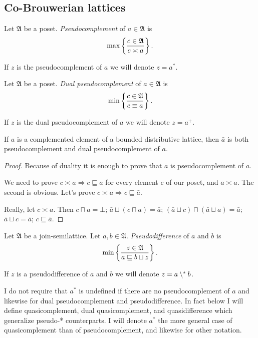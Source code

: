 \subsection{Co-Brouwerian lattices}
\begin{defn}
Let $\mathfrak{A}$ be a poset. \emph{Pseudocomplement}
of $a\in\mathfrak{A}$ is
\[
\max\left\{ \frac{c\in\mathfrak{A}}{c\asymp a}\right\}.
\]


If $z$ is the pseudocomplement of $a$ we will denote $z=a^{\ast}$.
\end{defn}

\begin{defn}
Let $\mathfrak{A}$ be a poset. \emph{Dual
pseudocomplement} of $a\in\mathfrak{A}$ is
\[
\min\left\{ \frac{c\in\mathfrak{A}}{c\equiv a}\right\}.
\]


If $z$ is the dual pseudocomplement of $a$ we will denote $z=a^{+}$.\end{defn}
\begin{prop}
If $a$ is a complemented element of a bounded distributive lattice,
then $\bar{a}$ is both pseudocomplement and dual pseudocomplement
of $a$.\end{prop}
\begin{proof}
Because of duality it is enough to prove that $\bar{a}$ is pseudocomplement
of $a$.

We need to prove $c\asymp a\Rightarrow c\sqsubseteq\bar{a}$ for every
element c of our poset, and $\bar{a}\asymp a$. The second is obvious.
Let's prove $c\asymp a\Rightarrow c\sqsubseteq\bar{a}$.

Really, let $c\asymp a$. Then $c\sqcap a=\bot$; $\bar{a}\sqcup(c\sqcap a)=\bar{a}$;
$(\bar{a}\sqcup c)\sqcap(\bar{a}\sqcup a)=\bar{a}$; $\bar{a}\sqcup c=\bar{a}$;
$c\sqsubseteq\bar{a}$.\end{proof}
\begin{defn}
Let $\mathfrak{A}$ be a join-semilattice.
Let $a,b\in\mathfrak{A}$. \emph{Pseudodifference} of $a$ and $b$
is
\[
\min\left\{ \frac{z\in\mathfrak{A}}{a\sqsubseteq b\sqcup z}\right\}.
\]


If $z$ is a pseudodifference of $a$ and $b$ we will denote $z=a\setminus^{\ast} b$.\end{defn}
\begin{rem}
I do not require that $a^{\ast}$ is undefined if there are no pseudocomplement
of $a$ and likewise for dual pseudocomplement and pseudodifference.
In fact below I will define quasicomplement, dual quasicomplement,
and quasidifference which generalize pseudo-{*} counterparts. I will
denote $a^{\ast}$ the more general case of quasicomplement than of
pseudocomplement, and likewise for other notation.\end{rem}
